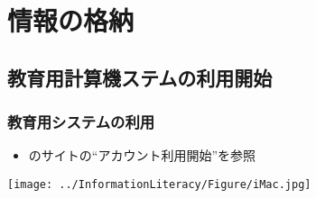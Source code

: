 \section{情報の格納}
\subsection{教育用計算機ステムの利用開始}
\begin{frame}[shrink]
\frametitle{教育用システムの利用}
  \begin{itemize}
\item \href{http://www.edu.gsic.titech.ac.jp/}{}のサイトの``アカウント利用開始''を参照
  \end{itemize}
  \begin{center}
\texttt{[image: ../InformationLiteracy/Figure/iMac.jpg]}
  \end{center}
\end{frame}
